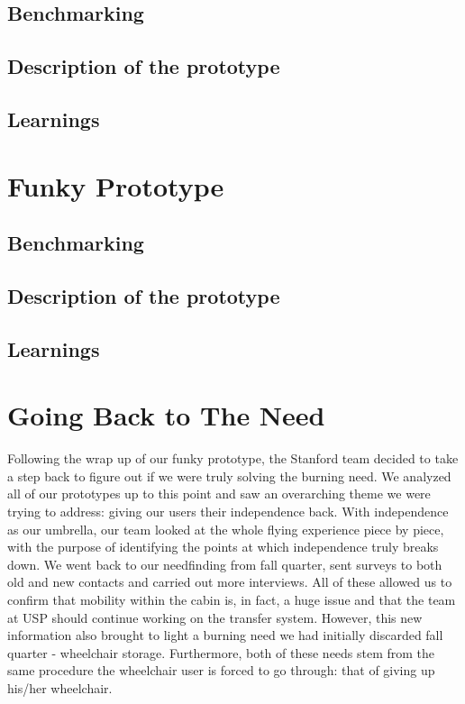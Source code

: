 \subsection{Benchmarking}

\subsection{Description of the prototype}


\subsection{Learnings}
\section{Funky Prototype}
\subsection{Benchmarking}
\subsection{Description of the prototype}
\subsection{Learnings}
\section{Going Back to The Need}
Following the wrap up of our funky prototype, the Stanford team decided to take a step back to figure out if we were truly solving the burning need. We analyzed all of our prototypes up to this point and saw an overarching theme we were trying to address: giving our users their independence back. With independence as our umbrella, our team looked at the whole flying experience piece by piece, with the purpose of identifying the points at which independence truly breaks down. We went back to our needfinding from fall quarter, sent surveys to both old and new contacts and carried out more interviews. All of these allowed us to confirm that mobility within the cabin is, in fact, a huge issue and that the team at USP should continue working on the transfer system. However, this new information also brought to light a burning need we had initially discarded fall quarter - wheelchair storage. Furthermore, both of these needs stem from the same procedure the wheelchair user is forced to go through: that of giving up his/her wheelchair. 

